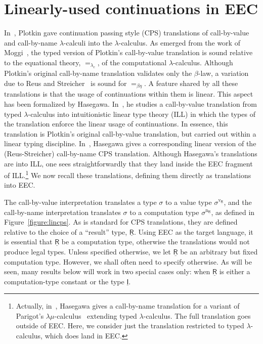 \documentclass{LMCS}
\newcommand{\comptype}[1]{\underline{#1}}
\newcommand{\CR}{\comptype{\mathsf{R}}}
\newcommand{\CI}{\comptype{\mathsf{I}}}
\newcommand{\LCequals}{=_{\lambda_c}}
\newcommand{\BEequals}{=_{\beta\eta}}
\newcommand{\cbvLincps}[1]{#1^{\mathrm{v_{\CR}}}}
\newcommand{\cbnLincps}[1]{#1^{\mathrm{n_{\CR}}}}
\begin{document}
\section{Linearly-used continuations in EEC}
\label{sec:lin:cps}


In~\cite{Plotkin}, Plotkin gave continuation passing style (CPS) translations 
of call-by-value and call-by-name $\lambda$-calculi into the 
$\lambda$-calculus. As emerged from the work of Moggi~\cite{Moggi:89,Moggi:91},
the typed version of Plotkin's call-by-value translation is
sound relative to the equational theory, $\LCequals$, of the computational $\lambda$-calculus.
Although Plotkin's original
call-by-name translation validates only the $\beta$-law, a variation
due to Reus and Streicher~\cite{RS} is sound for $\BEequals$.
A feature shared by all these translations is that the usage of  continuations
within them is linear. This aspect has been formalized by Hasegawa.
In~\cite{Hasegawa:Flops:02}, he studies a 
call-by-value translation from typed $\lambda$-calculus
into intuitionistic linear type theory (ILL) in which the types 
of the translation enforce the linear usage of continuations. In essence,
this translation is Plotkin's original call-by-value translation, but 
carried out within a  linear typing discipline.
In~\cite{Hasegawa:Flops:04}, Hasegawa gives a  corresponding linear version
of the (Reus-Streicher) call-by-name CPS translation.
Although Hasegawa's translations
are into ILL, one sees straightforwardly that they land
inside the EEC fragment of ILL.\footnote{Actually, in~\cite{Hasegawa:Flops:04}, Hasegawa 
gives a call-by-name translation for a variant of Parigot's $\lambda\mu$-calculus~\cite{Parigot:92}
extending typed $\lambda$-calculus. The full translation goes outside of EEC. Here, we consider
just the translation restricted to typed $\lambda$-calculus, which does land in EEC.}
We now recall these translations, defining them directly  as translations into EEC.

The call-by-value interpretation translates a type $\sigma$
to a value type $\cbvLincps{\sigma}$, and the call-by-name interpretation
translates $\sigma$ to a computation type $\cbnLincps{\sigma}$, as defined in
Figure~\ref{figure:lincps}.
As is standard for CPS translations, 
they are defined relative to the choice of a 
 ``result'' type, $\CR$.
Using EEC as the target language, 
it is essential that $\CR$ be a computation type, otherwise
the translations would not produce legal types.
Unless specified otherwise, we let $\CR$ be an arbitrary but fixed computation type. 
However, we shall often need to specify otherwise. As will be seen,
many results below will work in two special cases only:
when $\CR$ is either a computation-type constant or the type $\CI$.
\end{document}
